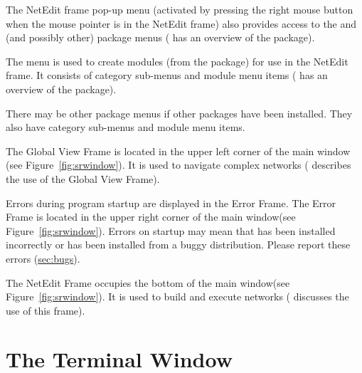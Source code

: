 \begin{description}
\begin{description}
    The NetEdit frame pop-up menu (activated by pressing the right
    mouse button when the mouse pointer is in the NetEdit frame) also
    provides access to the \menu{\sr{}} and \menu{\biopse{}} (and
    possibly other) package menus ( has an overview of the
    \sr{} package).
  \end{description}

  \begin{description}
     The  menu is used to create modules
    (from the \biopse  package) for use in the NetEdit frame.  It
    consists of category sub-menus and module menu items 
    ( has an overview of the \biopse{}package).
  \end{description}

  \begin{description}
     There may be other
    package menus if other packages have been installed.  They also
    have category sub-menus and module menu items.
  \end{description}
  
   The Global View Frame is located in the
  upper left corner of the main window (see
  Figure~\ref{fig:srwindow}). It is used to navigate complex networks
  ( describes the use of the Global View Frame).
  
   Errors during program startup are displayed
  in the Error Frame.  The Error Frame is located in the upper right
  corner of the main window(see Figure~\ref{fig:srwindow}).  Errors on
  startup may mean that \sr{} has been installed incorrectly or has
  been installed from a buggy distribution.  Please report these
  errors (\hyperref{report}{see Section~}{)}{sec:bugs}).
  
   The NetEdit Frame occupies the bottom of
  the main window(see Figure~\ref{fig:srwindow}).  It is used to build
  and execute networks (
  discusses the use of this frame).

\end{description}

\section{The Terminal Window}
\label{sec:termwinapp}

